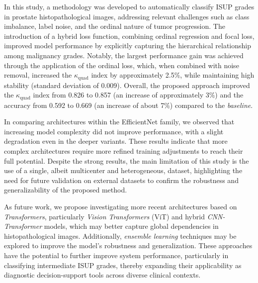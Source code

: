 In this study, a methodology was developed to automatically classify ISUP grades in prostate histopathological images, addressing relevant challenges such as class imbalance, label noise, and the ordinal nature of tumor progression. The introduction of a hybrid loss function, combining ordinal regression and focal loss, improved model performance by explicitly capturing the hierarchical relationship among malignancy grades. Notably, the largest performance gain was achieved through the application of the ordinal loss, which, when combined with noise removal, increased the $\kappa_{\text{quad}}$ index by approximately 2.5\%, while maintaining high stability (standard deviation of 0.009). Overall, the proposed approach improved the $\kappa_{\text{quad}}$ index from 0.826 to 0.857 (an increase of approximately 3\%) and the accuracy from 0.592 to 0.669 (an increase of about 7\%) compared to the \textit{baseline}. 

In comparing architectures within the EfficientNet family, we observed that increasing model complexity did not improve performance, with a slight degradation even in the deeper variants. These results indicate that more complex architectures require more refined training adjustments to reach their full potential. Despite the strong results, the main limitation of this study is the use of a single, albeit multicenter and heterogeneous, dataset, highlighting the need for future validation on external datasets to confirm the robustness and generalizability of the proposed method.

As future work, we propose investigating more recent architectures based on \textit{Transformers}, particularly \textit{Vision Transformers} (ViT) and hybrid \textit{CNN-Transformer} models, which may better capture global dependencies in histopathological images. Additionally, \textit{ensemble learning} techniques may be explored to improve the model's robustness and generalization. These approaches have the potential to further improve system performance, particularly in classifying intermediate ISUP grades, thereby expanding their applicability as diagnostic decision-support tools across diverse clinical contexts.